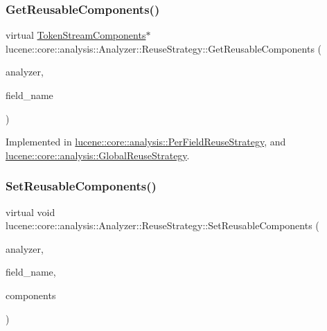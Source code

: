 \subsubsection{\texorpdfstring{Get\+Reusable\+Components()}{GetReusableComponents()}}
{\footnotesize\ttfamily virtual \mbox{\hyperlink{classlucene_1_1core_1_1analysis_1_1TokenStreamComponents}{Token\+Stream\+Components}}$\ast$ lucene\+::core\+::analysis\+::\+Analyzer\+::\+Reuse\+Strategy\+::\+Get\+Reusable\+Components (\begin{DoxyParamCaption}\item[{\mbox{\hyperlink{classlucene_1_1core_1_1analysis_1_1Analyzer}{Analyzer}} \&}]{analyzer,  }\item[{const std\+::string \&}]{field\+\_\+name }\end{DoxyParamCaption})\hspace{0.3cm}{\ttfamily [pure virtual]}}



Implemented in \mbox{\hyperlink{classlucene_1_1core_1_1analysis_1_1PerFieldReuseStrategy_ab0d86155823842bb28e43bbbec7c06d3}{lucene\+::core\+::analysis\+::\+Per\+Field\+Reuse\+Strategy}}, and \mbox{\hyperlink{classlucene_1_1core_1_1analysis_1_1GlobalReuseStrategy_a79b31d1f8bf9bec685377f6dbff3c5ba}{lucene\+::core\+::analysis\+::\+Global\+Reuse\+Strategy}}.

\mbox{\label{classlucene_1_1core_1_1analysis_1_1Analyzer_1_1ReuseStrategy_a78a1328d5564e78e2168169b73094b23}} 
\subsubsection{\texorpdfstring{Set\+Reusable\+Components()}{SetReusableComponents()}}
{\footnotesize\ttfamily virtual void lucene\+::core\+::analysis\+::\+Analyzer\+::\+Reuse\+Strategy\+::\+Set\+Reusable\+Components (\begin{DoxyParamCaption}\item[{\mbox{\hyperlink{classlucene_1_1core_1_1analysis_1_1Analyzer}{Analyzer}} \&}]{analyzer,  }\item[{const std\+::string \&}]{field\+\_\+name,  }\item[{\mbox{\hyperlink{classlucene_1_1core_1_1analysis_1_1TokenStreamComponents}{Token\+Stream\+Components}} $\ast$}]{components }\end{DoxyParamCaption})\hspace{0.3cm}{\ttfamily [pure virtual]}}



